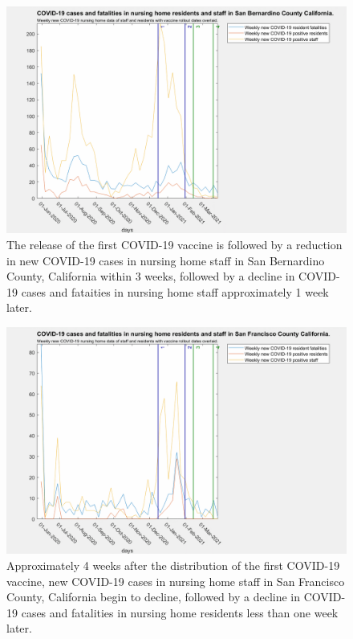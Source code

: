 \documentclass[twoside]{article}
\begin{document}
\begin{multicols}{2}
\begin{figure}[H]
	\includegraphics[width=\linewidth]{images/sanbernardino_nursing_home_with_vaccine.png}
	\caption{The release of the first COVID-19 vaccine is followed by a reduction in new COVID-19 cases in nursing home staff in San Bernardino County, California within 3 weeks, followed by a decline in COVID-19 cases and fataities in nursing home staff approximately 1 week later. }
	\label{fig:images/sanbernardino_nursing_home_with_vaccineLabel}
\end{figure}

\begin{figure}[H]
	\includegraphics[width=\linewidth]{images/sanfrancisco_nursing_home_with_vaccine.png}
	\caption{Approximately 4 weeks after the distribution of the first COVID-19 vaccine, new COVID-19 cases in nursing home staff in San Francisco County, California begin to decline, followed by a decline in COVID-19 cases and fatalities in nursing home residents less than one week later.  }
	\label{fig:images/sanfrancisco_nursing_home_with_vaccineLabel}
\end{figure}


\end{multicols}
\end{document}
